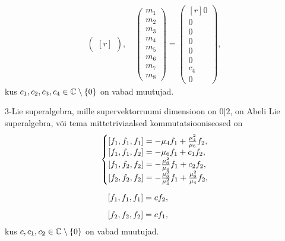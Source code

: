\begin{align*}
\begin{pmatrix*}[r]
    \end{pmatrix*},
    \quad
    \begin{pmatrix}
        m_1 \\
        m_2 \\
        m_3 \\
        m_4 \\
        m_5 \\
        m_6 \\
        m_7 \\
        m_8
    \end{pmatrix}
    =
    \begin{pmatrix*}[r]
        0 \\
        0 \\
        0 \\
        0 \\
        0 \\
        0 \\
        c_4 \\
        0
    \end{pmatrix*},
\end{align*}
\renewcommand\arraystretch{1}
kus $c_1, c_2, c_3, c_4 \in \mathbb{C} \setminus \{0\}$ on vabad muutujad.

\begin{lau}
    $3$-Lie superalgebra, mille supervektorruumi dimensioon on $0|2$, on Abeli
    Lie superalgebra, või tema mittetriviaalsed kommutatsiooniseosed on
    \renewcommand\arraystretch{1.2}
    \begin{align}
        & \left\{
            \begin{matrix*}[l]
                [f_1, f_1, f_1] = -\m_4 f_1 + \frac{\m_4^2}{\m_6} f_2, \\
                [f_1, f_1, f_2] = -\m_6 f_1 + c_1 f_2, \\
                [f_1, f_2, f_2] = -\frac{\m_6^2}{\m_4} f_1 + c_2 f_2, \\
                [f_2, f_2, f_2] = -\frac{\m_6^3}{\m_4^2} f_1 +
                    \frac{\m_6^2}{\m_4} f_2, \\
            \end{matrix*}
        \right. \\[0.2cm]
        &\ \ \ [f_1, f_1, f_1] = c f_2, \\[0.2cm]
        &\ \ \ [f_2, f_2, f_2] = c f_1,
    \end{align}
    \renewcommand\arraystretch{1}
    kus $c, c_1, c_2 \in \mathbb{C} \setminus \{ 0 \}$ on vabad muutujad.
\end{lau}

